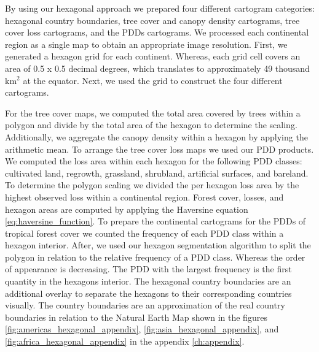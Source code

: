		By using our hexagonal approach we prepared four different cartogram categories: hexagonal country boundaries, tree cover and canopy density cartograms, tree cover loss cartograms, and the \acp{PDD} cartograms. We processed each continental region as a single map to obtain an appropriate image resolution. First, we generated a hexagon grid for each continent. Whereas, each grid cell covers an area of 0.5 x 0.5 decimal degrees, which translates to approximately 49 thousand km$^2$ at the equator. Next, we used the grid to construct the four different cartograms. 

		For the tree cover maps, we computed the total area covered by trees within a polygon and divide by the total area of the hexagon to determine the scaling. Additionally, we aggregate the canopy density within a hexagon by applying the arithmetic mean. To arrange the tree cover loss maps we used our \ac{PDD} products. We computed the loss area within each hexagon for the following \ac{PDD} classes: cultivated land, regrowth, grassland, shrubland, artificial surfaces, and bareland. To determine the polygon scaling we divided the per hexagon loss area by the highest observed loss within a continental region. Forest cover, losses, and hexagon areas are computed by applying the Haversine equation \ref{eq:haversine_function}. To prepare the continental cartograms for the \acp{PDD} of tropical forest cover we counted the frequency of each \ac{PDD} class within a hexagon interior. After, we used our hexagon segmentation algorithm to split the polygon in relation to the relative frequency of a \ac{PDD} class. Whereas the order of appearance is decreasing. The \ac{PDD} with the largest frequency is the first quantity in the hexagons interior. The hexagonal country boundaries are an additional overlay to separate the hexagons to their corresponding countries visually. The country boundaries are an approximation of the real country boundaries in relation to the Natural Earth Map shown in the figures \ref{fig:americas_hexagonal_appendix}, \ref{fig:asia_hexagonal_appendix}, and \ref{fig:africa_hexagonal_appendix} in the appendix \ref{ch:appendix}.